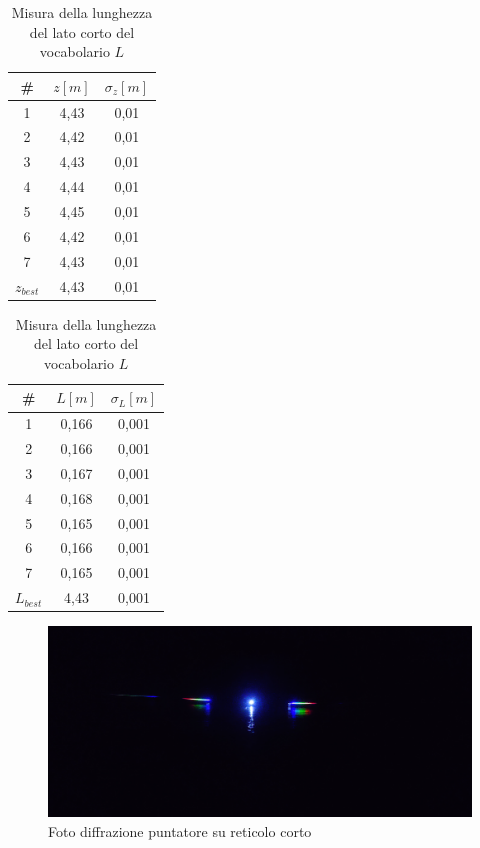 \documentclass{article}
\begin{document}
\begin{table}[h]
    \parbox{0.45\linewidth}{
        \centering
        \begin{tabular}{||c|c|c||}
            \hline
            \# & $z [m]$ & $\sigma_z [m]$\\
            \hline
            1 & 4,43 & 0,01 \\
            2 & 4,42 & 0,01 \\
            3 & 4,43 & 0,01 \\
            4 & 4,44 & 0,01 \\
            5 & 4,45 & 0,01 \\
            6 & 4,42 & 0,01 \\
            7 & 4,43 & 0,01 \\
            \hline
            $z_{best}$ & 4,43 & 0,01 \\
            \hline
        \end{tabular}
        \caption{Misura di $z$}
    }
\parbox{0.45\linewidth}{
    \centering
    \begin{tabular}{||c|c|c||}
        \hline
        \# & $L [m]$ & $\sigma_L [m]$ \\
        \hline
        1 & 0,166 & 0,001 \\
        2 & 0,166 & 0,001 \\
        3 & 0,167 & 0,001 \\
        4 & 0,168 & 0,001 \\
        5 & 0,165 & 0,001 \\
        6 & 0,166 & 0,001 \\
        7 & 0,165 & 0,001 \\
        \hline
        $L_{best}$ & 4,43 & 0,001 \\
        \hline
    \end{tabular}
    \caption{Misura della lunghezza del lato corto del vocabolario $L$}
}    
\end{table}

\begin{figure}[h]
    \centering
    \includegraphics[width=0.7\linewidth]{LedCorto1_OFF.jpg}
    \caption{Foto diffrazione puntatore su reticolo corto}
    \label{LedCorto}
\end{figure}
\end{document}
